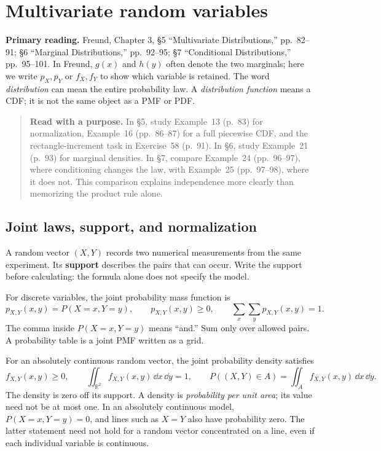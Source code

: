 \section{Multivariate random variables}
\label{sec:multivariate}

\noindent\textbf{Primary reading.} Freund, Chapter 3, \S5 ``Multivariate Distributions,'' pp.~82--91; \S6 ``Marginal Distributions,'' pp.~92--95; \S7 ``Conditional Distributions,'' pp.~95--101. In Freund, $g(x)$ and $h(y)$ often denote the two marginals; here we write $p_X,p_Y$ or $f_X,f_Y$ to show which variable is retained. The word \emph{distribution} can mean the entire probability law. A \emph{distribution function} means a CDF; it is not the same object as a PMF or PDF.

\begin{quote}
\textbf{Read with a purpose.} In \S5, study Example~13 (p.~83) for normalization, Example~16 (pp.~86--87) for a full piecewise CDF, and the rectangle-increment task in Exercise~58 (p.~91). In \S6, study Example~21 (p.~93) for marginal densities. In \S7, compare Example~24 (pp.~96--97), where conditioning changes the law, with Example~25 (pp.~97--98), where it does not. This comparison explains independence more clearly than memorizing the product rule alone.
\end{quote}

\subsection{Joint laws, support, and normalization}

A random vector $(X,Y)$ records two numerical measurements from the same experiment. Its \textbf{support} describes the pairs that can occur. Write the support before calculating: the formula alone does not specify the model.

For discrete variables, the joint probability mass function is
\[
 p_{X,Y}(x,y)=P(X=x,Y=y),\qquad
 p_{X,Y}(x,y)\geq0,\qquad \sum_x\sum_y p_{X,Y}(x,y)=1.
\]
The comma inside $P(X=x,Y=y)$ means ``and.'' Sum only over allowed pairs. A probability table is a joint PMF written as a grid.

For an absolutely continuous random vector, the joint probability density satisfies
\[
 f_{X,Y}(x,y)\geq0,\qquad
 \iint_{\mathbb R^2}f_{X,Y}(x,y)\,\dd x\,\dd y=1,
 \qquad
 P((X,Y)\in A)=\iint_A f_{X,Y}(x,y)\,\dd x\,\dd y.
\]
The density is zero off its support. A density is \emph{probability per unit area}; its value need not be at most one. In an absolutely continuous model, $P(X=x,Y=y)=0$, and lines such as $X=Y$ also have probability zero. The latter statement need not hold for a random vector concentrated on a line, even if each individual variable is continuous.

